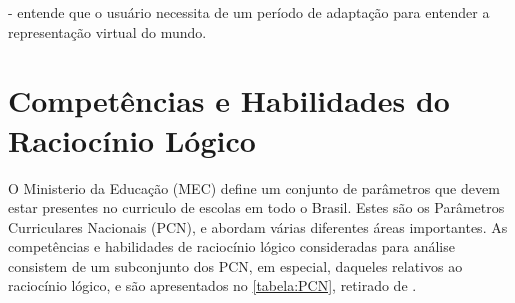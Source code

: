 - entende que o usuário necessita de um período de adaptação para entender a representação virtual do mundo.

\section{Competências e Habilidades do Raciocínio Lógico}\label{sec-competenciashabilidades}

O Ministerio da Educação (MEC) define um conjunto de parâmetros que devem estar presentes no curriculo de escolas em todo o Brasil. Estes são os Parâmetros Curriculares Nacionais (PCN), e abordam várias diferentes áreas importantes. 
As competências e habilidades de raciocínio lógico consideradas para análise consistem de um subconjunto dos PCN, em especial, daqueles relativos ao raciocínio lógico, e são apresentados no \autoref{tabela:PCN}, retirado de \cite{Tabuti:2015:tabela_habilidades}.

